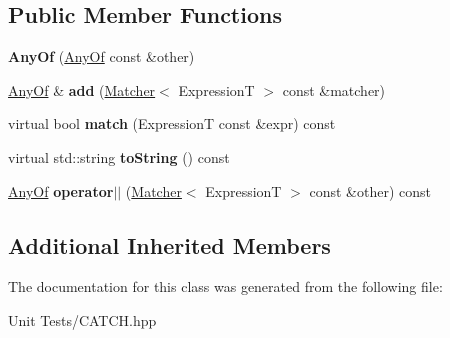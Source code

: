 \subsection*{Public Member Functions}
\begin{DoxyCompactItemize}
\item 
{\bfseries Any\+Of} (\hyperlink{classCatch_1_1Matchers_1_1Impl_1_1Generic_1_1AnyOf}{Any\+Of} const \&other)\hypertarget{classCatch_1_1Matchers_1_1Impl_1_1Generic_1_1AnyOf_a74fbc05b32d334fcbfd0fae0163a404e}{}\label{classCatch_1_1Matchers_1_1Impl_1_1Generic_1_1AnyOf_a74fbc05b32d334fcbfd0fae0163a404e}

\item 
\hyperlink{classCatch_1_1Matchers_1_1Impl_1_1Generic_1_1AnyOf}{Any\+Of} \& {\bfseries add} (\hyperlink{structCatch_1_1Matchers_1_1Impl_1_1Matcher}{Matcher}$<$ ExpressionT $>$ const \&matcher)\hypertarget{classCatch_1_1Matchers_1_1Impl_1_1Generic_1_1AnyOf_a3bce94b627551e5f96c5f9c6060413f0}{}\label{classCatch_1_1Matchers_1_1Impl_1_1Generic_1_1AnyOf_a3bce94b627551e5f96c5f9c6060413f0}

\item 
virtual bool {\bfseries match} (ExpressionT const \&expr) const \hypertarget{classCatch_1_1Matchers_1_1Impl_1_1Generic_1_1AnyOf_a2f97a08338e12deba541043a57d73db9}{}\label{classCatch_1_1Matchers_1_1Impl_1_1Generic_1_1AnyOf_a2f97a08338e12deba541043a57d73db9}

\item 
virtual std\+::string {\bfseries to\+String} () const \hypertarget{classCatch_1_1Matchers_1_1Impl_1_1Generic_1_1AnyOf_a7ecc6ec08b2018a643923a9d450aa328}{}\label{classCatch_1_1Matchers_1_1Impl_1_1Generic_1_1AnyOf_a7ecc6ec08b2018a643923a9d450aa328}

\item 
\hyperlink{classCatch_1_1Matchers_1_1Impl_1_1Generic_1_1AnyOf}{Any\+Of} {\bfseries operator$\vert$$\vert$} (\hyperlink{structCatch_1_1Matchers_1_1Impl_1_1Matcher}{Matcher}$<$ ExpressionT $>$ const \&other) const \hypertarget{classCatch_1_1Matchers_1_1Impl_1_1Generic_1_1AnyOf_a07f4ea2ae366a6521a5d7bff4522e8bf}{}\label{classCatch_1_1Matchers_1_1Impl_1_1Generic_1_1AnyOf_a07f4ea2ae366a6521a5d7bff4522e8bf}

\end{DoxyCompactItemize}
\subsection*{Additional Inherited Members}


The documentation for this class was generated from the following file\+:\begin{DoxyCompactItemize}
\item 
Unit Tests/C\+A\+T\+C\+H.\+hpp\end{DoxyCompactItemize}
